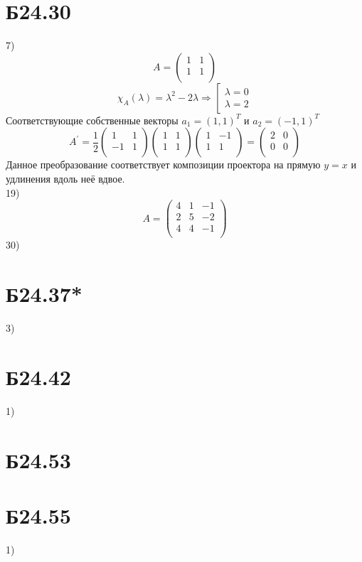 \documentclass[a4paper,12pt]{article} %
\begin{document}
\section*{Б24.30}
7)$$A=\begin{pmatrix*}
    1&1\\
    1&1\\
\end{pmatrix*}$$
$$\chi_A(\lambda)=\lambda^2-2\lambda\Rightarrow\left[\begin{matrix}
    \lambda=0\\
    \lambda=2
\end{matrix}\right.$$
Соответствующие собственные векторы $a_1=(1,1)^{T}$ и $a_2=(-1,1)^{T}$
$$A^{\prime}=\frac{1}{2}\begin{pmatrix*}
    1&1\\
    -1&1\\
\end{pmatrix*}\begin{pmatrix*}
    1&1\\
    1&1\\
\end{pmatrix*}\begin{pmatrix*}
    1&-1\\
    1&1\\
\end{pmatrix*}=\begin{pmatrix*}
    2&0\\
    0&0\\
\end{pmatrix*}$$
Данное преобразование соответствует композиции проектора на прямую $y=x$ и удлинения вдоль неё вдвое.\\
19)$$A=\begin{pmatrix*}
    4&1&-1\\
    2&5&-2\\
    4&4&-1\\
\end{pmatrix*}$$
30)
\section*{Б24.37*}3)
\section*{Б24.42}1)
\section*{Б24.53}
\section*{Б24.55}1)
\end{document}

